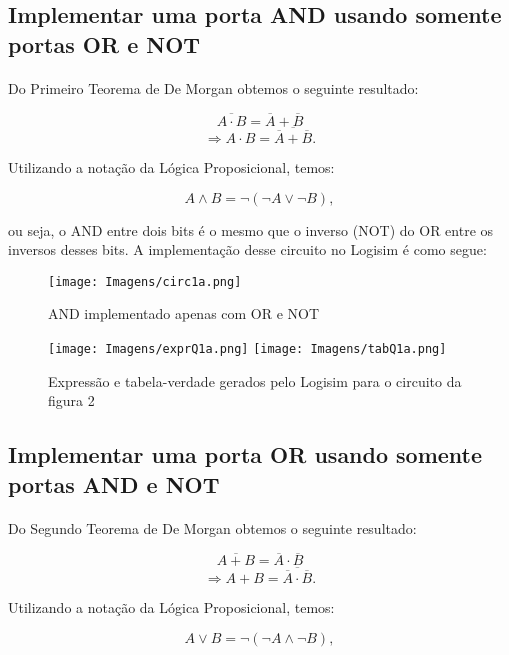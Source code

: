 \documentclass[a4paper, 12pt]{article}
\begin{document}
\subsection{Implementar uma porta AND usando somente portas OR e NOT}
\paragraph{}
Do Primeiro Teorema de De Morgan obtemos o seguinte resultado:

\[
\overline{A \cdot B} = \overline{A} + \overline{B}
\]
\[
\Rightarrow A \cdot B = \overline{\overline{A} + \overline{B}}.
\]

\noindent Utilizando a notação da Lógica Proposicional, temos:

\[
A \land B = \lnot (\lnot A \lor \lnot B),
\]

\noindent ou seja, o AND entre dois bits é o mesmo que o inverso (NOT) do OR entre os inversos desses bits. A implementação desse circuito no Logisim é como segue:

\begin{figure}[H]
    \centering
    \texttt{[image: Imagens/circ1a.png]}
    \caption{AND implementado apenas com OR e NOT}
\end{figure}

\begin{figure}[H]
    \centering
    \texttt{[image: Imagens/exprQ1a.png]}
    \texttt{[image: Imagens/tabQ1a.png]} \\
    \caption{Expressão e tabela-verdade gerados pelo Logisim para o circuito da figura 2}
\end{figure}

\subsection{Implementar uma porta OR usando somente portas AND e NOT}
\paragraph{}
Do Segundo Teorema de De Morgan obtemos o seguinte resultado:

\[
\overline{A + B} = \overline{A} \cdot \overline{B}
\]
\[
\Rightarrow A + B = \overline{\overline{A} \cdot \overline{B}}.
\]

\noindent Utilizando a notação da Lógica Proposicional, temos:

\[
A \lor B = \lnot (\lnot A \land \lnot B),
\]
\end{document}
